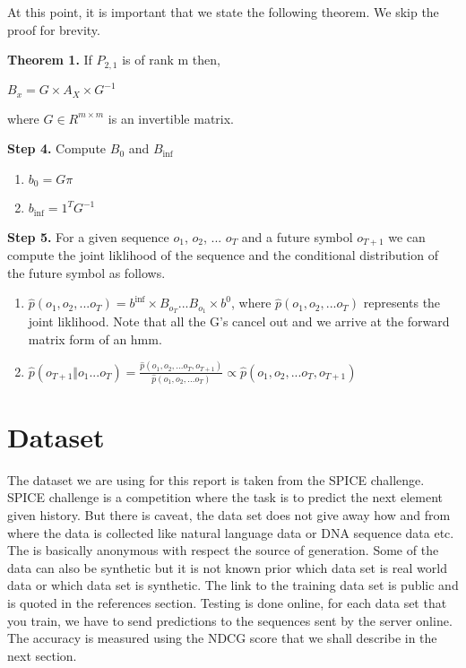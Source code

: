 \documentclass{article} %
\begin{document}
At this point, it is important that we state the following theorem. We skip the proof for brevity.

\textbf{Theorem 1.} If $P_{2,1}$ is of rank m then,
\begin{center}
$B_x = G \times A_X \times G^{-1}$
\end{center}
where $G \in R^{m \times m}$ is an invertible matrix.

\textbf{Step 4.} Compute $B_{0}$ and $B_{\inf}$
\begin{enumerate}
\item $b_{0} = G\pi$ 
\item $b_{\inf} = 1^TG^{-1}$
\end{enumerate}

\textbf{Step 5.} For a given sequence $o_1$, $o_2$, ... $o_T$ and a future symbol $o_{T+1}$ we can compute the joint liklihood of the sequence and the conditional distribution of the future symbol as follows.
\begin{enumerate}
\item $\hat{p}(o_1, o_2, ... o_T) = b^{\inf} \times B_{o_{T}} . . . B_{o_{1}} \times b^{0}$, 
\newline where $\hat{p}(o_1, o_2, ... o_T)$ represents the joint liklihood. Note that all the G's cancel out and we arrive at the forward matrix form of an hmm.

\item $\hat{p}(o_{T+1} \Vert o_{1}...o_{T} ) = \frac{\hat{p}(o_1, o_2, ... o_T, o_{T+1})}{\hat{p}(o_1, o_2, ... o_T)} \propto \hat{p}(o_1, o_2, ... o_T, o_{T+1})$ 

\end{enumerate}

\section{Dataset}
The dataset we are using for this report is taken from the SPICE challenge. SPICE challenge is a competition where the task is to predict the next element given history. But there is caveat, the data set does not give away how and from where the data is collected like natural language data or DNA sequence data etc. The is basically anonymous with respect the source of generation. Some of the data can also be synthetic but it is not known prior which data set is real world data or which data set is synthetic. The link to the training data set is public and is quoted in the references section. Testing is done online, for each data set that you train, we have to send predictions to the sequences sent by the server online. The accuracy is measured using the NDCG score that we shall describe in the next section.
\end{document}
